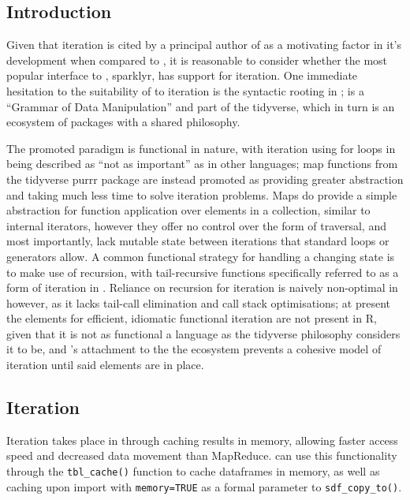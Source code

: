 \hypertarget{introduction}{%
	\subsection{Introduction}\label{sparklyr-introduction}}

Given that iteration is cited by a principal author of  as a
motivating factor in it's development when compared to , it is
reasonable to consider whether the most popular \R interface to ,
sparklyr, has support for iteration\cites{zaharia2010spark,luraschi20}.
One immediate hesitation to the suitability of  to iteration is
the syntactic rooting in ;  is a ``Grammar of Data
Manipulation'' and part of the tidyverse, which in turn is an ecosystem
of packages with a shared philosophy\cite{wickham2019welcome}\cite{wickham2016r}.

The promoted paradigm is functional in nature, with iteration using for
loops in \R being described as ``not as important'' as in other
languages; map functions from the tidyverse purrr package are instead
promoted as providing greater abstraction and taking much less time to
solve iteration problems. Maps do provide a simple abstraction for
function application over elements in a collection, similar to internal
iterators, however they offer no control over the form of traversal, and
most importantly, lack mutable state between iterations that standard
loops or generators allow\cite{cousineau1998functional}. A common
functional strategy for handling a changing state is to make use of
recursion, with tail-recursive functions specifically referred to as a
form of iteration in \cite{abelson1996structure}. Reliance on recursion
for iteration is naively non-optimal in \R however, as it lacks tail-call
elimination and call stack optimisations\cite{rcore2020lang}; at present
the elements for efficient, idiomatic functional iteration are not
present in R, given that it is not as functional a language as the
tidyverse philosophy considers it to be, and 's attachment to
the the ecosystem prevents a cohesive model of iteration until said
elements are in place.

\hypertarget{iteration}{%
	\subsection{Iteration}\label{iteration}}

Iteration takes place in  through caching results in memory,
allowing faster access speed and decreased data movement than
MapReduce\cite{zaharia2010spark}.  can use this functionality
through the \texttt{tbl_cache()} function to
cache  dataframes in memory, as well as caching upon import with
\texttt{memory=TRUE} as a formal parameter to
\texttt{sdf_copy_to()}.

